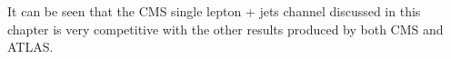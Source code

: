 It can be seen that the CMS single lepton + jets channel discussed in this chapter is very competitive with the other results produced by both CMS and ATLAS.






